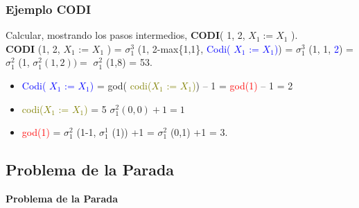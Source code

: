 \documentclass[xcolor=table]{beamer}
\begin{document}
\begin{frame}[fragile]\frametitle{Ejemplo CODI} \small

Calcular, mostrando los pasos intermedios, \textbf{CODI}( 1, 2, $X_1 := X_1$ ).\\


\textbf{CODI} (1, 2, $X_1$ := $X_1$ ) = \hspace{0.3cm} $\sigma^3_1$ (1, 2-max\{1,1\}, \textcolor{blue}{Codi(  $X_1$ :=  $X_1$)}) = \hspace{0.3cm}$\sigma^3_1$ (1, 1, \textcolor{blue}{2}) =  \hspace{0.3cm} $\sigma^2_1$ (1,  $\sigma^2_1 (1,2)) = $ \hspace{0.5cm} $\sigma^2_1$ (1,8) = 53.\\


\begin{itemize}
    \item \textcolor{blue}{Codi(  $X_1$ :=  $X_1$)} = god(\textcolor{olive}{ codi($X_1$ :=  $X_1$)}) – 1 = \textcolor{red}{god(1)} – 1 = 2
    \item \textcolor{olive}{ codi($X_1$ :=  $X_1$)} = 5 $\sigma^2_1 (0,0) +1 =1$
    \item \textcolor{red}{god(1)} = $\sigma^2_1$ (1-1, $\sigma^1_1$ (1)) +1 =  $\sigma^2_1$ (0,1) +1 = 3.
\end{itemize}


\end{frame}




\subsection{Problema de la Parada}
\begin{frame}  \Large

\begin{center}
    \textbf{Problema de la Parada}
\end{center}

\end{frame} 
\end{document}
